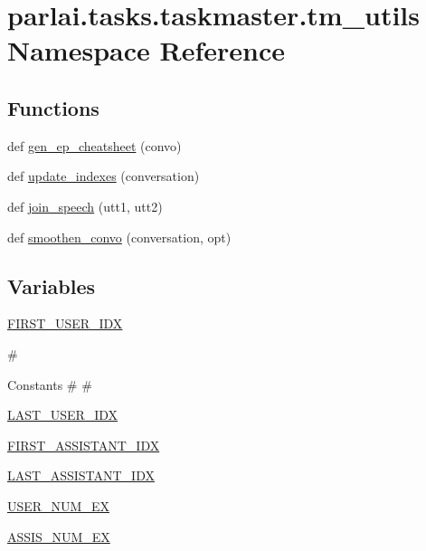 \hypertarget{namespaceparlai_1_1tasks_1_1taskmaster_1_1tm__utils}{}\section{parlai.\+tasks.\+taskmaster.\+tm\+\_\+utils Namespace Reference}
\label{namespaceparlai_1_1tasks_1_1taskmaster_1_1tm__utils}
\subsection*{Functions}
\begin{DoxyCompactItemize}
\item 
def \hyperlink{namespaceparlai_1_1tasks_1_1taskmaster_1_1tm__utils_aad8e1c42802da1765887ff0407bed1b1}{gen\+\_\+ep\+\_\+cheatsheet} (convo)
\item 
def \hyperlink{namespaceparlai_1_1tasks_1_1taskmaster_1_1tm__utils_ad0c8c99eb4b5152ca8cec2a8fe7895fd}{update\+\_\+indexes} (conversation)
\item 
def \hyperlink{namespaceparlai_1_1tasks_1_1taskmaster_1_1tm__utils_ad5d13cd462bd26919f078aa93174e9cd}{join\+\_\+speech} (utt1, utt2)
\item 
def \hyperlink{namespaceparlai_1_1tasks_1_1taskmaster_1_1tm__utils_ad9cc917cf497b3cd81ccb76a719cf1b7}{smoothen\+\_\+convo} (conversation, opt)
\end{DoxyCompactItemize}
\subsection*{Variables}
\begin{DoxyCompactItemize}
\item 
\hyperlink{namespaceparlai_1_1tasks_1_1taskmaster_1_1tm__utils_ad069bb7f5941c3b91ae51980ee415301}{F\+I\+R\+S\+T\+\_\+\+U\+S\+E\+R\+\_\+\+I\+DX}
\begin{DoxyCompactList}\small\item\em \begin{DoxyVerb}                                                        #
\end{DoxyVerb}
 Constants \# \# \end{DoxyCompactList}\item 
\hyperlink{namespaceparlai_1_1tasks_1_1taskmaster_1_1tm__utils_a4a431a3b6d3dca00cfe0a285417edb3d}{L\+A\+S\+T\+\_\+\+U\+S\+E\+R\+\_\+\+I\+DX}
\item 
\hyperlink{namespaceparlai_1_1tasks_1_1taskmaster_1_1tm__utils_a24ff77eca9426362dd0a284b42a1d7eb}{F\+I\+R\+S\+T\+\_\+\+A\+S\+S\+I\+S\+T\+A\+N\+T\+\_\+\+I\+DX}
\item 
\hyperlink{namespaceparlai_1_1tasks_1_1taskmaster_1_1tm__utils_af9a1d30925bd0532885974c2da251e1a}{L\+A\+S\+T\+\_\+\+A\+S\+S\+I\+S\+T\+A\+N\+T\+\_\+\+I\+DX}
\item 
\hyperlink{namespaceparlai_1_1tasks_1_1taskmaster_1_1tm__utils_aa41c5ba0826b1d1b11bd9ba79776bf52}{U\+S\+E\+R\+\_\+\+N\+U\+M\+\_\+\+EX}
\item 
\hyperlink{namespaceparlai_1_1tasks_1_1taskmaster_1_1tm__utils_a3c771fe1acfa39a7dbd3841f465d7393}{A\+S\+S\+I\+S\+\_\+\+N\+U\+M\+\_\+\+EX}
\end{DoxyCompactItemize}


